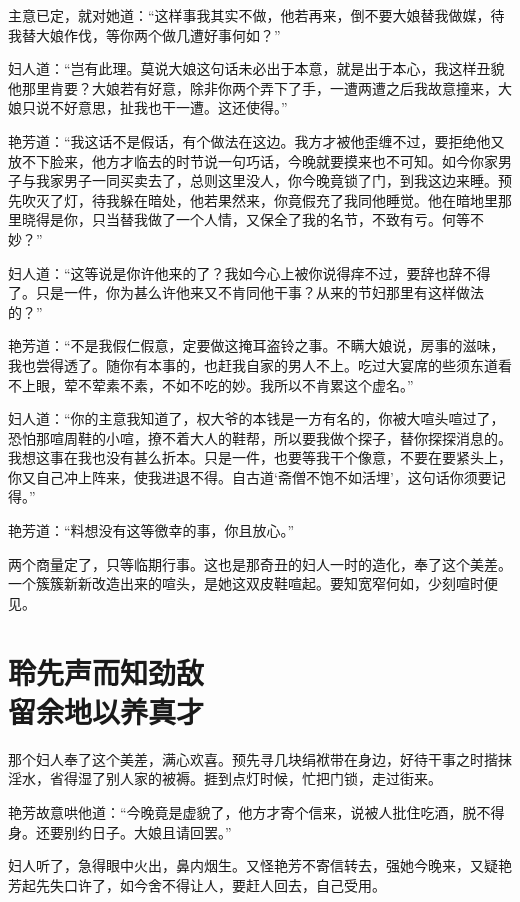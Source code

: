 \documentclass[a4paper,12pt,UTF8,twoside]{ctexbook}
\begin{document}
主意已定，就对她道：“这样事我其实不做，他若再来，倒不要大娘替我做媒，待我替大娘作伐，等你两个做几遭好事何如？”

妇人道：“岂有此理。莫说大娘这句话未必出于本意，就是出于本心，我这样丑貌他那里肯要？大娘若有好意，除非你两个弄下了手，一遭两遭之后我故意撞来，大娘只说不好意思，扯我也干一遭。这还使得。”

艳芳道：“我这话不是假话，有个做法在这边。我方才被他歪缠不过，要拒绝他又放不下脸来，他方才临去的时节说一句巧话，今晚就要摸来也不可知。如今你家男子与我家男子一同买卖去了，总则这里没人，你今晚竟锁了门，到我这边来睡。预先吹灭了灯，待我躲在暗处，他若果然来，你竟假充了我同他睡觉。他在暗地里那里晓得是你，只当替我做了一个人情，又保全了我的名节，不致有亏。何等不妙？”

妇人道：“这等说是你许他来的了？我如今心上被你说得痒不过，要辞也辞不得了。只是一件，你为甚么许他来又不肯同他干事？从来的节妇那里有这样做法的？”

艳芳道：“不是我假仁假意，定要做这掩耳盗铃之事。不瞒大娘说，房事的滋味，我也尝得透了。随你有本事的，也赶我自家的男人不上。吃过大宴席的些须东道看不上眼，荤不荤素不素，不如不吃的妙。我所以不肯累这个虚名。”

妇人道：“你的主意我知道了，权大爷的本钱是一方有名的，你被大喧头喧过了，恐怕那喧周鞋的小喧，撩不着大人的鞋帮，所以要我做个探子，替你探探消息的。我想这事在我也没有甚么折本。只是一件，也要等我干个像意，不要在要紧头上，你又自己冲上阵来，使我进退不得。自古道‘斋僧不饱不如活埋’，这句话你须要记得。”

艳芳道：“料想没有这等徼幸的事，你且放心。”

两个商量定了，只等临期行事。这也是那奇丑的妇人一时的造化，奉了这个美差。一个簇簇新新改造出来的喧头，是她这双皮鞋喧起。要知宽窄何如，少刻喧时便见。

\chapter[聆先声而知劲敌\ 留余地以养真才]{聆先声而知劲敌\\留余地以养真才}

那个妇人奉了这个美差，满心欢喜。预先寻几块绢袱带在身边，好待干事之时揩抹淫水，省得湿了别人家的被褥。捱到点灯时候，忙把门锁，走过街来。

艳芳故意哄他道：“今晚竟是虚貌了，他方才寄个信来，说被人批住吃酒，脱不得身。还要别约日子。大娘且请回罢。”

妇人听了，急得眼中火出，鼻内烟生。又怪艳芳不寄信转去，强她今晚来，又疑艳芳起先失口许了，如今舍不得让人，要赶人回去，自己受用。
\end{document}
